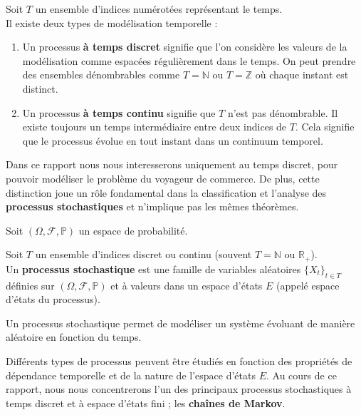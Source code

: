 \documentclass{article}
\begin{document}
\begin{tcolorbox}[colback=white,colframe=blue!80!black,title=Temps Discret et Temps Continu]
Soit $T$ un ensemble d'indices numérotées représentant le temps. \\

Il existe deux types de modélisation temporelle :
\begin{enumerate}[leftmargin=5em, label=(\arabic*)]
  \item Un processus \textbf{à temps discret} signifie que l'on considère les valeurs de la modélisation comme espacées régulièrement dans le temps.
  On peut prendre des ensembles dénombrables comme $T = \mathbb{N}$ ou $T = \mathbb{Z}$ où chaque instant est distinct.
  \item Un processus \textbf{à temps continu} signifie que $T$ n'est pas dénombrable. Il existe toujours un temps intermédiaire entre deux indices de $T$.
  Cela signifie que le processus évolue en tout instant dans un continuum temporel.
\end{enumerate}
\end{tcolorbox}

Dans ce rapport nous nous interesserons uniquement au temps discret, pour pouvoir modéliser le problème du voyageur de commerce.
De plus, cette distinction joue un rôle fondamental dans la classification et l'analyse des \textbf{processus stochastiques} et n'implique pas les mêmes théorèmes. \\

\begin{tcolorbox}[colback=white,colframe=blue!80!black,title=Processus Stochastique]
Soit $(\Omega, \mathcal{F}, \mathbb{P})$ un espace de probabilité.

Soit $T$ un ensemble d'indices discret ou continu (souvent $T = \mathbb{N}$ ou $\mathbb{R}_+$). \\

Un \textbf{processus stochastique} est une famille de variables aléatoires $\{X_t\}_{t \in T}$ définies sur $(\Omega, \mathcal{F}, \mathbb{P})$ et à valeurs dans un espace d'états $E$ (appelé espace d'états du processus).
\end{tcolorbox}

Un processus stochastique permet de modéliser un système évoluant de manière aléatoire en fonction du temps.

Différents types de processus peuvent être étudiés en fonction des propriétés de dépendance temporelle et de la nature de l'espace d'états $E$.
Au cours de ce rapport, nous nous concentrerons l'un des principaux processus stochastiques à temps discret et à espace d'états fini ; les \textbf{chaînes de Markov}. \\
\end{document}

